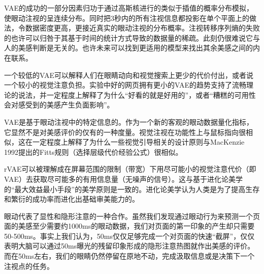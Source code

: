 VAE的成功的一部分因素归功于通过高斯核进行的类似于插值的概率分布模拟，使眼动注视的呈连续分布。同时把3秒内的所有注视信息都投影在单个平面上的做法，令数据密度更高，更接近真实的眼动注视的分布概率。注视转移序列熵的失败的也许可以归咎于其基于时间的统计方式导致的数据量的稀疏。此刻仍很难说它与人的美感判断是无关的。也许未来可以找到更适用的模型来找出其余美感之间的内在联系。

一个较低的VAE可以解释人们在眼睛动向和视觉搜索上更少的代价付出，或者说一个较小的视觉注意负担。实验中好的网页拥有更小的VAE的趋势支持了流畅理论的说法，并一定程度上解释了为什么“好看的就是好用的”，或者“糟糕的可用性会对感受到的美感产生负面影响”。

VAE是基于眼动注视中的特定信息的。作为一个新的客观的眼动数据量化指标，它显然不是对美感评价的仅有的一种度量。视觉注视在功能性上与鼠标指向很相似，这在一定程度上解释了为什么一些视觉引导相关的设计原则与MacKenzie 1992提出的Fitts规则（选择层级代价经验公式）很相似。

rVAE可以被理解成在屏幕范围的限制（带宽）下用尽可能小的视觉注意代价（即VAE）去获取尽可能多的有用信息量（无噪声的信号）。这与基于进化论美学的“最大效益最小手段”的美学原则是一致的。进化论美学认为人类是为了提高生存和繁衍的成功率而进化出基础审美能力的。

眼动代表了显性和隐形注意的一种合作。虽然我们发现通过眼动行为来预测一个页面的美感至少需要约1000ms的眼动数据，我们对页面的第一印象的产生却只需要50-500ms。事实上我们认为，50ms仅仅足够完成一个对页面的快速“截屏”，仅仅表明大脑可以通过50ms曝光的残留印象形成的隐形注意热图就作出美感的评价。而在50ms左右，我们的眼睛仍然停留在原地不动，完成汲取信息或是决策下一个注视点的任务。
